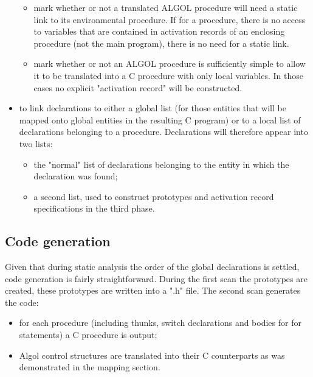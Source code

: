 \documentclass[11pt]{article}
\begin{document}
\begin{itemize}
\begin{itemize}
\item mark whether or not a translated ALGOL procedure will need a static link
to its environmental procedure. If for a procedure, there is no access to
variables that are contained in activation records of an enclosing
procedure (not the main program), there is no need for a static link.
\item mark whether or not an ALGOL procedure is sufficiently simple to allow
it to be translated into a C procedure with only local variables. In those cases
no explicit "activation record" will be constructed. 
\end{itemize}
\item to link declarations to either a global list (for those entities that
will be mapped onto global entities in the resulting C program) or to
a local list of declarations belonging to a procedure. Declarations will
therefore appear into two lists:
\begin{itemize}
\item the "normal" list of declarations belonging to the entity in which the
declaration was found;
\item a second list, used to construct prototypes and
activation record specifications in the third phase.
\end{itemize}
\end{itemize}
\subsection{Code generation}
Given that during static analysis the order of the global declarations
is settled, code generation is fairly straightforward. During the
first scan the prototypes are created, these prototypes are written into
a ".h" file. The second scan generates the code:
\begin{itemize}
\item for each procedure (including thunks, switch declarations and
bodies for for statements) a C procedure is output;
\item Algol control structures are translated into their C counterparts
as was demonstrated in the mapping section.
\end{itemize}
\end{document}
